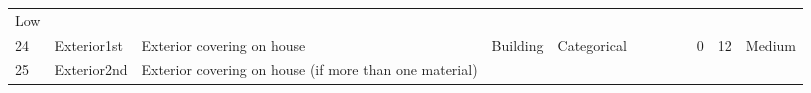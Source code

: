 \documentclass[11pt]{article}
\begin{document}
\begin{longtable}[]{@{}llllllllllll@{}}
\begin{minipage}[t]{0.04\columnwidth}
Low\strut
\end{minipage}\tabularnewline
\begin{minipage}[t]{0.04\columnwidth}\raggedright\strut
24\strut
\end{minipage} & \begin{minipage}[t]{0.04\columnwidth}\raggedright\strut
Exterior1st\strut
\end{minipage} & \begin{minipage}[t]{0.04\columnwidth}\raggedright\strut
Exterior covering on house\strut
\end{minipage} & \begin{minipage}[t]{0.04\columnwidth}\raggedright\strut
Building\strut
\end{minipage} & \begin{minipage}[t]{0.04\columnwidth}\raggedright\strut
Categorical\strut
\end{minipage} & \begin{minipage}[t]{0.04\columnwidth}\raggedright\strut
\strut
\end{minipage} & \begin{minipage}[t]{0.04\columnwidth}\raggedright\strut
\strut
\end{minipage} & \begin{minipage}[t]{0.04\columnwidth}\raggedright\strut
\strut
\end{minipage} & \begin{minipage}[t]{0.04\columnwidth}\raggedright\strut
\strut
\end{minipage} & \begin{minipage}[t]{0.04\columnwidth}\raggedright\strut
0\strut
\end{minipage} & \begin{minipage}[t]{0.04\columnwidth}\raggedright\strut
12\strut
\end{minipage} & \begin{minipage}[t]{0.04\columnwidth}\raggedright\strut
Medium\strut
\end{minipage}\tabularnewline
\begin{minipage}[t]{0.04\columnwidth}\raggedright\strut
25\strut
\end{minipage} & \begin{minipage}[t]{0.04\columnwidth}\raggedright\strut
Exterior2nd\strut
\end{minipage} & \begin{minipage}[t]{0.04\columnwidth}\raggedright\strut
Exterior covering on house (if more than one material)\strut
\end{minipage} & \begin{minipage}[t]{0.04\columnwidth}\raggedright\strut

\end{minipage}
\end{longtable}
\end{document}
